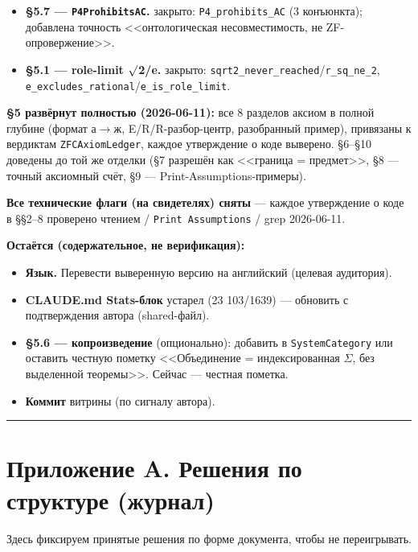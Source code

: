 \documentclass[11pt,a4paper]{article}
\begin{document}
\begin{itemize}
\item \textbf{\S{}5.7 --- \texttt{P4Prohibits\allowbreak{}AC}.} закрыто: \texttt{P4\_\allowbreak{}prohibits\_\allowbreak{}AC} (3 конъюнкта); добавлена точность <<онтологическая несовместимость, не ZF-опровержение>>.
\item \textbf{\S{}5.1 --- role-limit $\surd$2/e.} закрыто: \texttt{sqrt2\_\allowbreak{}never\_\allowbreak{}reached}/\texttt{r\_\allowbreak{}sq\_\allowbreak{}ne\_\allowbreak{}2}, \texttt{e\_\allowbreak{}excludes\_\allowbreak{}rational}/\texttt{e\_\allowbreak{}is\_\allowbreak{}role\_\allowbreak{}limit}.
\end{itemize}

\textbf{\S{}5 развёрнут полностью (2026-06-11):} все 8 разделов аксиом в полной глубине (формат а$\to$ж, E/R/R-разбор-центр, разобранный пример), привязаны к вердиктам \texttt{ZFCAxiom\allowbreak{}Ledger}, каждое утверждение о коде выверено. \S{}6--\S{}10 доведены до той же отделки (\S{}7 разрешён как <<граница = предмет>>, \S{}8 --- точный аксиомный счёт, \S{}9 --- Print-Assumptions-примеры).

\textbf{Все технические флаги (на свидетелях) сняты} --- каждое утверждение о коде в \S{}\S{}2--8 проверено чтением / \texttt{Print Assumptions} / grep 2026-06-11.

\textbf{Остаётся (содержательное, не верификация):}
\begin{itemize}
\item \textbf{Язык.} Перевести выверенную версию на английский (целевая аудитория).
\item \textbf{CLAUDE.md Stats-блок} устарел (23 103/1639) --- обновить с подтверждения автора (shared-файл).
\item \textbf{\S{}5.6 --- копроизведение} (опционально): добавить в \texttt{System\allowbreak{}Category} или оставить честную пометку <<Объединение = индексированная $\Sigma$, без выделенной теоремы>>. Сейчас --- честная пометка.
\item \textbf{Коммит} витрины (по сигналу автора).
\end{itemize}

\bigskip\hrule\bigskip

\section*{Приложение A. Решения по структуре (журнал)}

Здесь фиксируем принятые решения по форме документа, чтобы не переигрывать.
\end{document}
